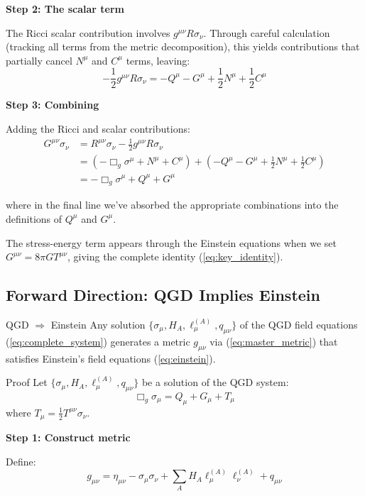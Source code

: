\documentclass[11pt,a4paper]{article}
\theoremstyle{definition}
\theoremstyle{remark}
\begin{document}
		\textbf{Step 2: The scalar term}
		
		The Ricci scalar contribution involves $g^{\mu\nu}R\sigma_\nu$. Through careful calculation (tracking all terms from the metric decomposition), this yields contributions that partially cancel $N^\mu$ and $C^\mu$ terms, leaving:
		\begin{equation}
			-\frac{1}{2}g^{\mu\nu}R\sigma_\nu = -Q^\mu - G^\mu + \frac{1}{2}N^\mu + \frac{1}{2}C^\mu
		\end{equation}
		
		\textbf{Step 3: Combining}
		
		Adding the Ricci and scalar contributions:
		\begin{align}
			G^{\mu\nu}\sigma_\nu &= R^{\mu\nu}\sigma_\nu - \frac{1}{2}g^{\mu\nu}R\sigma_\nu\\
			&= (-\Box_g\sigma^\mu + N^\mu + C^\mu) + (-Q^\mu - G^\mu + \frac{1}{2}N^\mu + \frac{1}{2}C^\mu)\\
			&= -\Box_g\sigma^\mu + Q^\mu + G^\mu
		\end{align}
		
		where in the final line we've absorbed the appropriate combinations into the definitions of $Q^\mu$ and $G^\mu$.
		
		The stress-energy term appears through the Einstein equations when we set $G^{\mu\nu} = 8\pi GT^{\mu\nu}$, giving the complete identity (\ref{eq:key_identity}).
	
	\subsection{Forward Direction: QGD Implies Einstein}
	
	QGD $\Rightarrow$ Einstein\label{thm:forward}
		Any solution $\{\sigma_\mu, H_A, \ell_\mu^{(A)}, q_{\mu\nu}\}$ of the QGD field equations (\ref{eq:complete_system}) generates a metric $g_{\mu\nu}$ via (\ref{eq:master_metric}) that satisfies Einstein's field equations (\ref{eq:einstein}).
	
	Proof
		Let $\{\sigma_\mu, H_A, \ell_\mu^{(A)}, q_{\mu\nu}\}$ be a solution of the QGD system:
		\begin{equation}
			\Box_g\sigma_\mu = Q_\mu + G_\mu + T_\mu
		\end{equation}
		where $T_\mu = \frac{1}{2}T^{\mu\nu}\sigma_\nu$.
		
		\textbf{Step 1: Construct metric}
		
		Define:
		\begin{equation}
			g_{\mu\nu} = \eta_{\mu\nu} - \sigma_\mu\sigma_\nu + \sum_A H_A\ell_\mu^{(A)}\ell_\nu^{(A)} + q_{\mu\nu}
		\end{equation}
		
\end{document}
